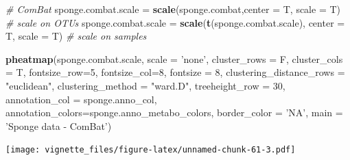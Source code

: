 \documentclass[]{book}
\newenvironment{Shaded}{\begin{snugshade}}{\end{snugshade}}
\newcommand{\KeywordTok}[1]{\textcolor[rgb]{0.13,0.29,0.53}{\textbf{#1}}}
\newcommand{\DataTypeTok}[1]{\textcolor[rgb]{0.13,0.29,0.53}{#1}}
\newcommand{\DecValTok}[1]{\textcolor[rgb]{0.00,0.00,0.81}{#1}}
\newcommand{\StringTok}[1]{\textcolor[rgb]{0.31,0.60,0.02}{#1}}
\newcommand{\CommentTok}[1]{\textcolor[rgb]{0.56,0.35,0.01}{\textit{#1}}}
\newcommand{\NormalTok}[1]{#1}
\begin{document}
\begin{Shaded}
\begin{Highlighting}[]
\CommentTok{# ComBat }
\NormalTok{sponge.combat.scale =}\StringTok{ }\KeywordTok{scale}\NormalTok{(sponge.combat,}\DataTypeTok{center =}\NormalTok{ T, }\DataTypeTok{scale =}\NormalTok{ T) }\CommentTok{# scale on OTUs}
\NormalTok{sponge.combat.scale =}\StringTok{ }\KeywordTok{scale}\NormalTok{(}\KeywordTok{t}\NormalTok{(sponge.combat.scale), }\DataTypeTok{center =}\NormalTok{ T, }\DataTypeTok{scale =}\NormalTok{ T) }\CommentTok{# scale on samples}

\KeywordTok{pheatmap}\NormalTok{(sponge.combat.scale, }
         \DataTypeTok{scale =} \StringTok{'none'}\NormalTok{, }
         \DataTypeTok{cluster_rows =}\NormalTok{ F, }
         \DataTypeTok{cluster_cols =}\NormalTok{ T, }
         \DataTypeTok{fontsize_row=}\DecValTok{5}\NormalTok{, }\DataTypeTok{fontsize_col=}\DecValTok{8}\NormalTok{,}
         \DataTypeTok{fontsize =} \DecValTok{8}\NormalTok{,}
         \DataTypeTok{clustering_distance_rows =} \StringTok{"euclidean"}\NormalTok{,}
         \DataTypeTok{clustering_method =} \StringTok{"ward.D"}\NormalTok{,}
         \DataTypeTok{treeheight_row =} \DecValTok{30}\NormalTok{,}
         \DataTypeTok{annotation_col =}\NormalTok{ sponge.anno_col,}
         \DataTypeTok{annotation_colors=}\NormalTok{sponge.anno_metabo_colors,}
         \DataTypeTok{border_color =} \StringTok{'NA'}\NormalTok{,}
         \DataTypeTok{main =} \StringTok{'Sponge data - ComBat'}\NormalTok{)}
\end{Highlighting}
\end{Shaded}

\texttt{[image: vignette\_files/figure-latex/unnamed-chunk-61-3.pdf]}
\end{document}
